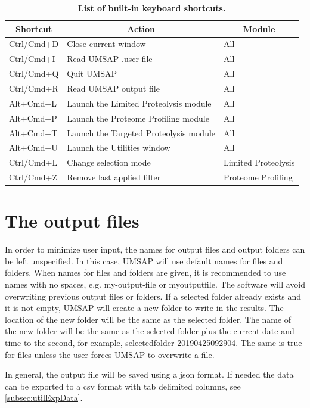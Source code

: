 \begin{table}[h!]
	\centering
	\begin{tabular}{l l l}
		\hline
		\multicolumn{1}{c}{Shortcut} & \multicolumn{1}{c}{Action} & \multicolumn{1}{c}{Module} \\
		\hline
		Ctrl/Cmd+D & Close current window & All \\		
		Ctrl/Cmd+I  & Read UMSAP .uscr file & All \\		
		Ctrl/Cmd+Q & Quit UMSAP                & All \\
		Ctrl/Cmd+R & Read UMSAP output file  & All \\		
		Alt+Cmd+L & Launch the Limited Proteolysis module & All \\
		Alt+Cmd+P & Launch the Proteome Profiling module  & All \\
		Alt+Cmd+T & Launch the Targeted Proteolysis module & All \\
		Alt+Cmd+U & Launch the Utilities window & All \\		
		Ctrl/Cmd+L & Change selection mode & Limited Proteolysis \\								
		Ctrl/Cmd+Z & Remove last applied filter & Proteome Profiling \\
		\hline		
	\end{tabular}
	\caption[List of built-in keyboard shortcuts]{\textbf{List of built-in keyboard shortcuts.}}
	\label{table:shortcuts}
\end{table}

\section{The output files}

In order to minimize user input, the names for output files and output folders can be left unspecified. In this case, UMSAP will use default names for files and folders. When names for files and folders are given, it is recommended to use names with no spaces, e.g. my-output-file or myoutputfile. The software will avoid overwriting previous output files or folders. If a selected folder already exists and it is not empty, UMSAP will create a new folder to write in the results. The location of the new folder will be the same as the selected folder. The name of the new folder will be the same as the selected folder plus the current date and time to the second, for example, selectedfolder-20190425092904. The same is true for files unless the user forces UMSAP to overwrite a file. 

In general, the output file will be saved using a json format. If needed the data can be exported to a csv format with tab delimited columns, see \autoref{subsec:utilExpData}. 

